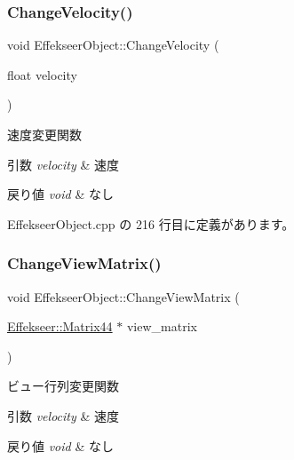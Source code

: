 \subsubsection{\texorpdfstring{Change\+Velocity()}{ChangeVelocity()}}
{\footnotesize\ttfamily void Effekseer\+Object\+::\+Change\+Velocity (\begin{DoxyParamCaption}\item[{float}]{velocity }\end{DoxyParamCaption})}



速度変更関数 


\begin{DoxyParams}{引数}
{\em velocity} & 速度 \\
\hline
\end{DoxyParams}

\begin{DoxyRetVals}{戻り値}
{\em void} & なし \\
\hline
\end{DoxyRetVals}


 Effekseer\+Object.\+cpp の 216 行目に定義があります。

\mbox{\label{class_effekseer_object_a822247e8b5effa83ccf7239283f83326}} 
\subsubsection{\texorpdfstring{Change\+View\+Matrix()}{ChangeViewMatrix()}}
{\footnotesize\ttfamily void Effekseer\+Object\+::\+Change\+View\+Matrix (\begin{DoxyParamCaption}\item[{\mbox{\hyperlink{struct_effekseer_1_1_matrix44}{Effekseer\+::\+Matrix44}} $\ast$}]{view\+\_\+matrix }\end{DoxyParamCaption})}



ビュー行列変更関数 


\begin{DoxyParams}{引数}
{\em velocity} & 速度 \\
\hline
\end{DoxyParams}

\begin{DoxyRetVals}{戻り値}
{\em void} & なし \\
\hline
\end{DoxyRetVals}


